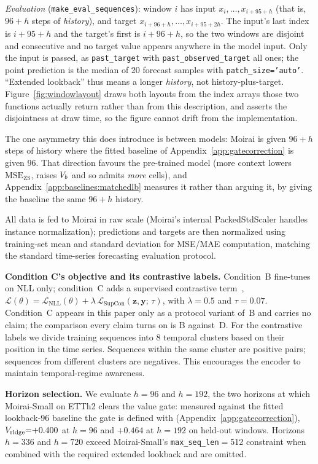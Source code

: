 \emph{Evaluation} (\texttt{make\_eval\_sequences}): window $i$ has input
$x_i,\dots,x_{i+95+h}$ (that is, $96{+}h$ steps of \emph{history}),
and target $x_{i+96+h},\dots,x_{i+95+2h}$.  The input's last index is
$i+95+h$ and the target's first is $i+96+h$, so the two windows are
disjoint and consecutive and no target value appears anywhere in the model
input.  Only the input is passed, as \texttt{past\_target} with
\texttt{past\_observed\_target} all ones; the point prediction is the
median of 20 forecast samples with \texttt{patch\_size='auto'}.
``Extended lookback'' thus means a longer \emph{history}, not
history-plus-target.  Figure~\ref{fig:windowlayout} draws both layouts
from the index arrays those two functions actually return rather than from
this description, and asserts the disjointness at draw time, so the figure
cannot drift from the implementation.

The one asymmetry this does introduce is between models: Moirai is given
$96{+}h$ steps of history where the fitted baseline of
Appendix~\ref{app:gatecorrection} is given 96.  That direction favours the
pre-trained model (more context lowers $\text{MSE}_{\text{ZS}}$, raises
$V_{b}$ and so admits \emph{more} cells), and
Appendix~\ref{app:baselines:matchedlb} measures it rather than arguing it, by
giving the baseline the same $96{+}h$ history.

All data is fed to Moirai in raw scale (Moirai's internal
PackedStdScaler handles instance normalization); predictions and targets
are then normalized using training-set mean and standard deviation
for MSE/MAE computation, matching the standard time-series forecasting
evaluation protocol.

\textbf{Condition C's objective and its contrastive labels.}
Condition~B fine-tunes on NLL only; condition~C adds a supervised contrastive
term~\cite{khosla2020supcon},
$\mathcal{L}(\theta) = \mathcal{L}_{\text{NLL}}(\theta) +
\lambda\,\mathcal{L}_{\text{SupCon}}(\mathbf{z}, \mathbf{y};\, \tau)$, with
$\lambda = 0.5$ and $\tau = 0.07$.  Condition~C appears in this paper only as a
protocol variant of~B and carries no claim; the comparison every claim turns on
is B against~D.
For the contrastive labels we divide training sequences into
8 temporal clusters based on their position in the time series.
Sequences within the same cluster are positive pairs; sequences from
different clusters are negatives.
This encourages the encoder to maintain temporal-regime awareness.

\textbf{Horizon selection.}
We evaluate $h{=}96$ and $h{=}192$, the two horizons at which Moirai-Small on
ETTh2 clears the value gate: measured against the fitted lookback-96 baseline
the gate is defined with (Appendix~\ref{app:gatecorrection}),
$V_{\text{ridge}}{=}{+}0.400$ at $h{=}96$ and ${+}0.464$ at
$h{=}192$ on held-out windows.
Horizons $h{=}336$ and $h{=}720$ exceed Moirai-Small's
\texttt{max\_seq\_len}$=$512 constraint when combined with the
required extended lookback and are omitted.

